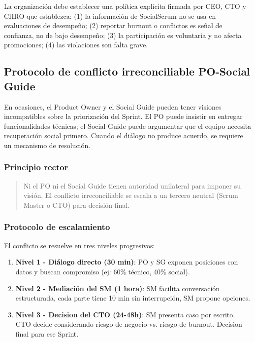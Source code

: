La organización debe establecer una política explícita firmada por CEO, CTO y CHRO que establezca: (1) la información de SocialScrum no se usa en evaluaciones de desempeño; (2) reportar burnout o conflictos es señal de confianza, no de bajo desempeño; (3) la participación es voluntaria y no afecta promociones; (4) las violaciones son falta grave.

\subsection{Protocolo de conflicto irreconciliable PO-Social Guide}

En ocasiones, el Product Owner y el Social Guide pueden tener visiones incompatibles sobre la priorización del Sprint. El PO puede insistir en entregar funcionalidades técnicas; el Social Guide puede argumentar que el equipo necesita recuperación social primero. Cuando el diálogo no produce acuerdo, se requiere un mecanismo de resolución.

\subsubsection{Principio rector}

\begin{quote}
    Ni el PO ni el Social Guide tienen autoridad unilateral para imponer su visión. El conflicto irreconciliable se escala a un tercero neutral (Scrum Master o CTO) para decisión final.
\end{quote}

\subsubsection{Protocolo de escalamiento}

El conflicto se resuelve en tres niveles progresivos:

\begin{enumerate}
    \item \textbf{Nivel 1 - Diálogo directo (30 min)}: PO y SG exponen posiciones con datos y buscan compromiso (ej: 60\% técnico, 40\% social).
    \item \textbf{Nivel 2 - Mediación del SM (1 hora)}: SM facilita conversación estructurada, cada parte tiene 10 min sin interrupción, SM propone opciones.
    \item \textbf{Nivel 3 - Decision del CTO (24-48h)}: SM presenta caso por escrito. CTO decide considerando riesgo de negocio vs. riesgo de burnout. Decision final para ese Sprint.
\end{enumerate}

